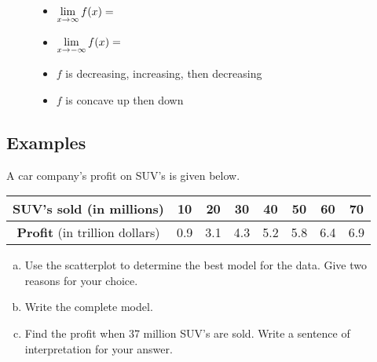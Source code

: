 \documentclass[notes]{subfiles}
\begin{document}
\begin{figure}[h!]
{\begin{minipage}{1in}
		\end{minipage}
		\begin{minipage}{2in}
			\begin{itemize}
				\item $\displaystyle \lim_{x\to\infty} f(x) =$ 
				\item $\displaystyle \lim_{x\to -\infty} f(x) =$ 
				\item $f$ is decreasing, increasing, then decreasing
				\item $f$ is concave up then down
			\end{itemize}
		\end{minipage}
		}
		\end{figure} 

	\subsection*{Examples}
		\begin{ex} A car company's profit on SUV's is given below.  
			\begin{center}
				{\renewcommand{\arraystretch}{1.2}
				\begin{tabular}{|c||c|c|c|c|c|c|c|}\hline
					\textbf{SUV's sold} (in millions) & 10 & 20 & 30 & 40 & 50 & 60 & 70\\ \hline
					\textbf{Profit} (in trillion dollars) & 0.9 & 3.1 & 4.3 & 5.2 & 5.8 & 6.4 & 6.9\\ \hline 
				\end{tabular}		
				}
			\end{center}
			\begin{enumerate}[(a)]
				\item Use the scatterplot to determine the best model for the data.  Give two reasons for your choice.
				\item Write the complete model.
				\item Find the profit when 37 million SUV's are sold.  Write a sentence of interpretation for your answer.
			\end{enumerate}
		\end{ex}
			\newpage
\end{document}
